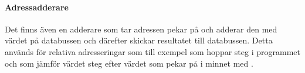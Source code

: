 \documentclass[main.tex]{subfiles}
\begin{document}
\paragraph{Adressadderare} %
Det finns även en adderare som tar adressen  pekar på och adderar
den med värdet på databussen och därefter skickar resultatet till databussen.
Detta används för relativa adresseringar som till exempel  som
hoppar  steg i programmet och  som jämför värdet
 steg efter värdet som  pekar på i minnet med .

\end{document}
